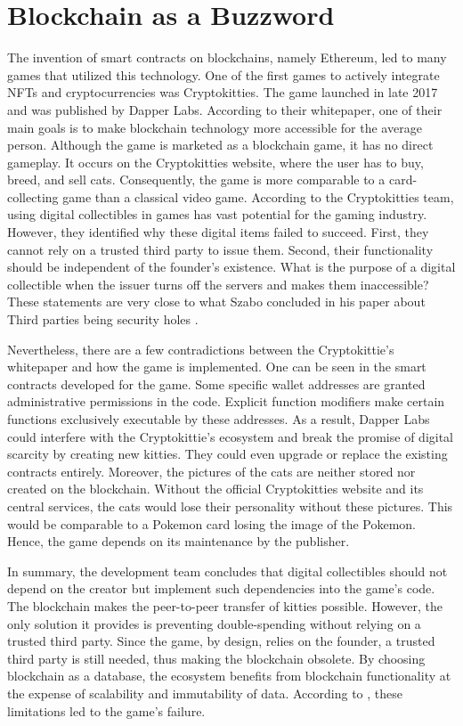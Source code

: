 \section{Blockchain as a Buzzword} 
The invention of smart contracts on blockchains, namely Ethereum, led to many games that utilized this technology.
One of the first games to actively integrate NFTs and cryptocurrencies was Cryptokitties. The game launched in late 2017 and was published by Dapper Labs. \cite{serada2021}
According to their whitepaper, one of their main goals is to make blockchain technology more accessible for the average person.
Although the game is marketed as a blockchain game, it has no direct gameplay.
It occurs on the Cryptokitties website, where the user has to buy, breed, and sell cats.
Consequently, the game is more comparable to a card-collecting game than a classical video game.
According to the Cryptokitties team, using digital collectibles in games has vast potential for the gaming industry. 
However, they identified why these digital items failed to succeed.
First, they cannot rely on a trusted third party to issue them. 
Second, their functionality should be independent of the founder's existence. 
What is the purpose of a digital collectible when the issuer turns off the servers and makes them inaccessible? \cite{cryptokitties2017}
These statements are very close to what Szabo concluded in his paper about Third parties being security holes \cite{szabo2001}.

Nevertheless, there are a few contradictions between the Cryptokittie's whitepaper and how the game is implemented.
One can be seen in the smart contracts developed for the game. \cite{source_cryptokitties_2017}
Some specific wallet addresses are granted administrative permissions in the code.
Explicit function modifiers make certain functions exclusively executable by these addresses. 
As a result, Dapper Labs could interfere with the Cryptokittie's ecosystem and break the promise of digital scarcity by creating new kitties. 
They could even upgrade or replace the existing contracts entirely.
Moreover, the pictures of the cats are neither stored nor created on the blockchain. 
Without the official Cryptokitties website and its central services, the cats would lose their personality without these pictures. 
This would be comparable to a Pokemon card losing the image of the Pokemon.
Hence, the game depends on its maintenance by the publisher.

In summary, the development team concludes that digital collectibles should not depend on the creator but implement such dependencies into the game's code.
The blockchain makes the peer-to-peer transfer of kitties possible.
However, the only solution it provides is preventing double-spending without relying on a trusted third party. 
Since the game, by design, relies on the founder, a trusted third party is still needed, thus making the blockchain obsolete.
By choosing blockchain as a database, the ecosystem benefits from blockchain functionality at the expense of scalability and immutability of data.
According to \cite{jiang2021}, these limitations led to the game's failure.

